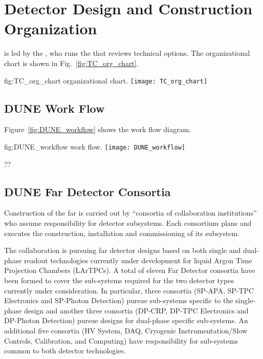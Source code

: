 \chapter{Detector Design and Construction Organization}
\label{vl:tc-overview}

 is led by the , who runs the  that
reviews  technical options. The  organizational
chart is shown in Fig.~\ref{fig:TC_org_chart}.
\begin{dunefigure}{fig:TC_org_chart}
  {  organizational chart.}
  \texttt{[image: TC\_org\_chart]}
\end{dunefigure}


\section{DUNE Work Flow}
\label{sec:workflow}

Figure~\ref{fig:DUNE_workflow} shows the  work flow diagram.
\begin{dunefigure}{fig:DUNE_workflow}
  { work flow.}
  \texttt{[image: DUNE\_workflow]}
\end{dunefigure}

??

\section{DUNE Far Detector Consortia}
\label{sec:consortia}

Construction of the  far  is carried out
by ``consortia of collaboration institutions'' who assume
responsibility for detector subsystems.  Each consortium plans and
executes the construction, installation and commissioning of its
subsystem.

The  collaboration is pursuing far detector designs based
on both single and dual-phase readout technologies currently under
development for liquid Argon Time Projection Chambers (LArTPCs).  A
total of eleven Far Detector consortia have been formed to cover the
sub-systems required for the two detector types currently under
consideration.  In particular, three consortia (SP-APA, SP-TPC
Electronics and SP-Photon Detection) pursue sub-systems specific to
the single-phase design and another three consortia (DP-CRP, DP-TPC
Electronics and DP-Photon Detection) pursue designs for dual-phase
specific sub-systems.  An additional five consortia (HV System, DAQ,
Cryogenic Instrumentation/Slow Controls, Calibration, and Computing)
have responsibility for sub-systems common to both detector
technologies.


